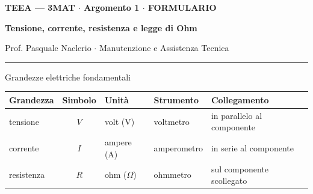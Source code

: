 \documentclass[11pt,a4paper]{article}
\newcommand{\ohm}{\ensuremath{\Omega}}
\newcommand{\per}{\ensuremath{\cdot}}
\newcommand{\intestazione}[3]{%
  {\color{verde}\bfseries\small #1}\par\vspace{1mm}
  {\fontsize{19}{23}\selectfont\bfseries #2}\par\vspace{1mm}
  {\small\color{tenue} #3}\par\vspace{2mm}
  {\color{verde}\rule{\linewidth}{1.6pt}}\par\vspace{4mm}}
\begin{document}
\intestazione{TEEA --- 3MAT \per{} Argomento 1 \per{} FORMULARIO}
             {Tensione, corrente, resistenza e legge di Ohm}
             {Prof. Pasquale Naclerio \per{} Manutenzione e Assistenza Tecnica}

\begin{blocco}{Grandezze elettriche fondamentali}
\begin{tabularx}{\linewidth}{@{}l c l l X@{}}
\toprule
\textbf{Grandezza} & \textbf{Simbolo} & \textbf{Unità} & \textbf{Strumento} & \textbf{Collegamento}\\
\midrule
\color{tensione}tensione   & \color{tensione}$V$   & volt (V)    & voltmetro   & in parallelo al componente\\
\color{corrente}corrente   & \color{corrente}$I$   & ampere (A)  & amperometro & in serie al componente\\
\color{resistenza}resistenza & \color{resistenza}$R$ & ohm (\ohm)   & ohmmetro    & sul componente scollegato\\
\bottomrule
\end{tabularx}
\end{blocco}
\end{document}
